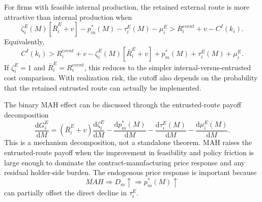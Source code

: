 \documentclass[12pt]{article}
\newcommand{\1}{\mathbf{1}}
\newcommand{\dd}{\mathrm{d}}
\begin{document}
For firms with feasible internal production, the retained external route is more attractive than internal production when
\begin{equation}
    \zeta_i^E(M)\left[\bar R_i^E+v\right]
    -p_m^*(M)-\tau_i^E(M)-\mu_i^E
    >
    R_i^{event}+v-C^I(k_i).
    \label{eq:external_beats_internal_logit}
\end{equation}
Equivalently,
\begin{equation}
    C^I(k_i)
    >
    R_i^{event}+v
    -
    \zeta_i^E(M)\left[\bar R_i^E+v\right]
    +p_m^*(M)+\tau_i^E(M)+\mu_i^E.
    \label{eq:manufacturing_comparison_logit}
\end{equation}
If $\zeta_i^E=1$ and $\bar R_i^E=R_i^{event}$, this reduces to the simpler internal-versus-entrusted cost comparison. With realization risk, the cutoff also depends on the probability that the retained entrusted route can actually be implemented.

The binary MAH effect can be discussed through the entrusted-route payoff decomposition
\begin{equation}
    \frac{\dd G_i^E}{\dd M}
    =
    \left(\bar R_i^E+v\right)\frac{\dd \zeta_i^E}{\dd M}
    -
    \frac{\dd p_m^*(M)}{\dd M}
    -
    \frac{\dd \tau_i^E(M)}{\dd M}
    -
    \frac{\dd \mu_i^E(M)}{\dd M}.
    \label{eq:GE_M_decomposition}
\end{equation}
This is a mechanism decomposition, not a standalone theorem. MAH raises the entrusted-route payoff when the improvement in feasibility and policy friction is large enough to dominate the contract-manufacturing price response and any residual holder-side burden. The endogenous price response is important because
\[
    MAH\Rightarrow D_m\uparrow\Rightarrow p_m^*(M)\uparrow
\]
can partially offset the direct decline in $\tau_i^E$.
\end{document}
